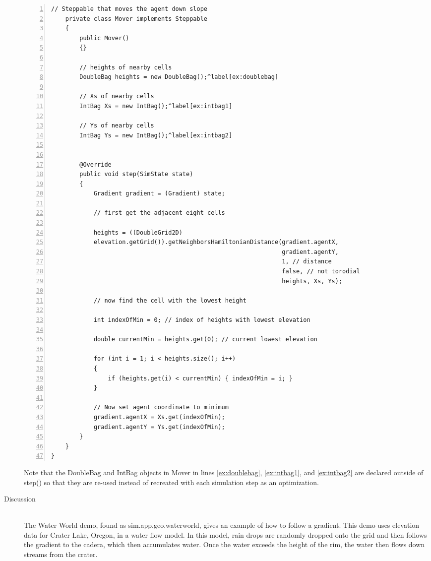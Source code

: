 \documentclass[twoside,10pt]{book}
\newcommand\class[1]{\index{Classes!{#1}}\textsf{#1}}
\newcommand\method[1]{\textsf{#1}}
\newcommand\code[1]{\textsf{#1}}
\begin{document}
\begin{description}
\begin{Verbatim}[frame=lines,framesep=5mm,label=Your SimStateClass,numbers=left,commandchars=^\[\]]
    // Steppable that moves the agent down slope
    private class Mover implements Steppable
    {
        public Mover()
        {}

        // heights of nearby cells
        DoubleBag heights = new DoubleBag();^label[ex:doublebag]

        // Xs of nearby cells
        IntBag Xs = new IntBag();^label[ex:intbag1]

        // Ys of nearby cells
        IntBag Ys = new IntBag();^label[ex:intbag2]


        @Override
        public void step(SimState state)
        {
            Gradient gradient = (Gradient) state;

            // first get the adjacent eight cells

            heights = ((DoubleGrid2D)
            elevation.getGrid()).getNeighborsHamiltonianDistance(gradient.agentX,
                                                                 gradient.agentY,
                                                                 1, // distance
                                                                 false, // not torodial
                                                                 heights, Xs, Ys);

            // now find the cell with the lowest height

            int indexOfMin = 0; // index of heights with lowest elevation

            double currentMin = heights.get(0); // current lowest elevation

            for (int i = 1; i < heights.size(); i++)
            {
                if (heights.get(i) < currentMin) { indexOfMin = i; }
            }

            // Now set agent coordinate to minimum
            gradient.agentX = Xs.get(indexOfMin);
            gradient.agentY = Ys.get(indexOfMin);
        }
    }
}
\end{Verbatim}

Note that the \class{DoubleBag} and \class{IntBag} objects in
\code{Mover} in lines \ref{ex:doublebag}, \ref{ex:intbag1}, and
\ref{ex:intbag2} are declared outside of \method{step()} so that they
are re-used instead of recreated with each simulation step as an
optimization.

\item[Discussion]~\\
  The Water World demo, found as \code{sim.app.geo.waterworld}, gives
  an example of how to follow a gradient.  This demo uses elevation
  data for Crater Lake, Oregon, in a water flow model.  In this model,
  rain drops are randomly dropped onto the grid and then follows the
  gradient to the cadera, which then accumulates water.  Once the
  water exceeds the height of the rim, the water then flows down
  streams from the crater.
\end{description}
\end{document}
